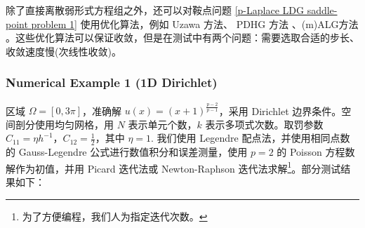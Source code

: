 除了直接离散弱形式方程组之外，还可以对鞍点问题 \eqref{p-Laplace LDG saddle-point problem 1} 使用优化算法，例如 Uzawa 方法、 PDHG 方法 \cite{zhu2008efficient, 10.1007/s10851-010-0251-1}、(m)ALG方法 \cite{10.1137/16M1067792}。这些优化算法可以保证收敛，但是在测试中有两个问题：需要选取合适的步长、收敛速度慢(次线性收敛)。


\subsubsection{Numerical Example 1 (1D Dirichlet)}

区域 \(\Omega = [0,3\pi]\)，准确解 \(u(x) = (x+1)^{\frac{p-2}{p-1}}\)，采用 Dirichlet 边界条件。空间剖分使用均匀网格，用 \(N\) 表示单元个数，\(k\) 表示多项式次数。取罚参数 \(C_{11} = \eta h^{-1}\)，\(C_{12} = \frac{1}{2}\)，其中 \(\eta = 1\). 我们使用 Legendre 配点法，并使用相同点数的 Gauss-Legendre 公式进行数值积分和误差测量，使用 \(p = 2\) 的 Poisson 方程数解作为初值，并用 Picard 迭代法或 Newton-Raphson 迭代法求解\footnote{为了方便编程，我们人为指定迭代次数。}。部分测试结果如下：

\begin{table}[H]
	\begin{center}
		\caption{\(p = 1.05\)，\(k = 1\)}
	\end{center}
\end{table}

